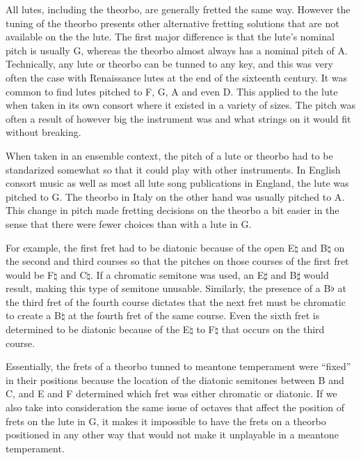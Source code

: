All lutes, including the theorbo, are generally fretted the same way.  However the tuning
of the theorbo presents other alternative fretting solutions that are not available on the
the lute. The first major difference is that the lute's nominal pitch is usually G,
whereas the theorbo almost always has a nominal pitch of A.  Technically, any lute or
theorbo can be tunned to any key, and this was very often the case with Renaissance lutes
at the end of the sixteenth century. It was common to find lutes pitched to F, G, A and
even D.  This applied to the lute when taken in its own consort where it existed in a
variety of sizes.  The pitch was often a result of however big the instrument was and what
strings on it would fit without breaking.

When taken in an ensemble context, the pitch of a lute or theorbo had to be standarized
somewhat so that it could play with other instruments.  In English consort music as well
as most all lute song publications in England, the lute was pitched to G.  The theorbo in
Italy on the other hand was usually pitched to A.  This change in pitch made fretting
decisions on the theorbo a bit easier in the sense that there were fewer choices than with
a lute in G.

For example, the first fret had to be diatonic because of the open E$\natural$ and
B$\natural$ on the second and third courses so that the pitches on those courses of the
first fret would be F$\natural$ and C$\natural$.  If a chromatic semitone was used, an
E$\sharp$ and B$\sharp$ would result, making this type of semitone unusable. Similarly,
the presence of a B$\flat$ at the third fret of the fourth course dictates that the next
fret must be chromatic to create a B$\natural$ at the fourth fret of the same course.
Even the sixth fret is determined to be diatonic because of the E$\natural$ to F$\natural$
that occurs on the third course.

Essentially, the frets of a theorbo tunned to meantone temperament were ``fixed'' in their
positions because the location of the diatonic semitones between B and C, and E and F
determined which fret was either chromatic or diatonic.  If we also take into
consideration the same issue of octaves that affect the position of frets on the lute in
G, it makes it impossible to have the frets on a theorbo positioned in any other way that
would not make it unplayable in a meantone temperament.

